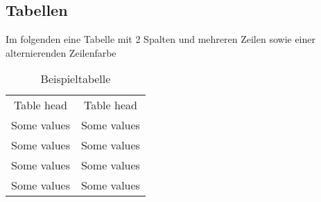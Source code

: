 \subsection{Tabellen}\label{subsec:tables}
	
Im folgenden eine Tabelle mit 2 Spalten und mehreren Zeilen sowie einer alternierenden Zeilenfarbe
	
\begin{table}[H]
	\centering
	\caption{Beispieltabelle}
	\label{tab:test}
	\begin{tabular}{|c|c|}
    	\rowcolor{gray!50}
    	\hline
    	Table head & Table head\\
    	Some values & Some values\\
    	Some values & Some values\\
    	Some values & Some values\\
    	Some values & Some values\\
    	\hline
  	\end{tabular}
\end{table}